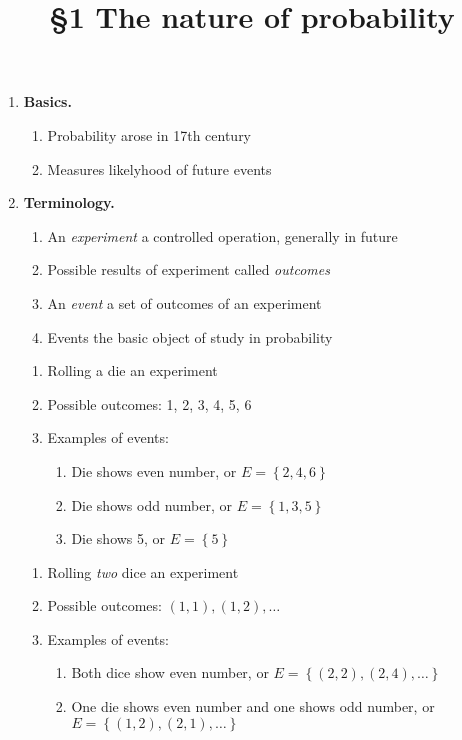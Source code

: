 \documentclass{ximera}
\title{\S1 The nature of probability}
\begin{document}
\maketitle
\begin{enumerate}

\item{\bf Basics.}
\begin{enumerate}
\item Probability arose in 17th century
\item Measures likelyhood of future events
\end{enumerate}

\item{\bf Terminology.}
\begin{enumerate}
\item An {\em experiment} a controlled operation,
generally in future
\item Possible results of experiment called {\em outcomes}
\item An {\em event} a set of outcomes of an experiment
\item Events the basic object of study in probability
\end{enumerate}

\begin{example}
\begin{enumerate}
\item Rolling a die an experiment
\item Possible outcomes: 1, 2, 3, 4, 5, 6
\item Examples of events:
\begin{enumerate}
\item Die shows even number, or $E=\left\{2,4,6\right\}$
\item Die shows odd number, or $E=\left\{1,3,5\right\}$
\item Die shows 5, or $E=\left\{5\right\}$
\end{enumerate}
\end{enumerate}
\end{example}

\begin{example}
\begin{enumerate}
\item Rolling {\em two} dice an experiment
\item Possible outcomes: $\left(1,1\right),\left(1,2\right),\ldots$
\item Examples of events:
\begin{enumerate}
\item Both dice show even number, or $E=\left\{\left(2,2\right),
\left(2,4\right),\ldots\right\}$
\item One die shows even number and one shows odd number,
or $E=\left\{\left(1,2\right),\left(2,1\right),\ldots\right\}$
\end{enumerate}
\end{enumerate}
\end{example}


\end{enumerate}
\end{document}
